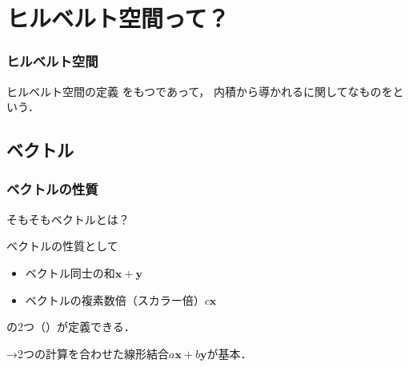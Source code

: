 \documentclass[
    10pt,
    ]{sotsu-beamer}
\begin{document}
\section{ヒルベルト空間って？}

\begin{frame}[label={frame:definition-of-Hilbert-space}]
    \frametitle{ヒルベルト空間}


    \pause

    \begin{block}{ヒルベルト空間の定義}
        をもつであって，
        内積から導かれるに関してなものをという．
    \end{block}

\end{frame}


\subsection{ベクトル}

\begin{frame}
    \frametitle{ベクトルの性質}

    そもそもベクトルとは？

    ベクトルの性質として
    \begin{itemize}
        \item ベクトル同士の和\( \symbf{x} + \symbf{y} \)
        \item ベクトルの複素数倍（スカラー倍）\( c \symbf{x} \)
    \end{itemize}
    の2つ（）が定義できる．

    →2つの計算を合わせた\alert{線形結合$a \symbf{x} + b \symbf{y}$}が基本．

\end{frame}
\end{document}
